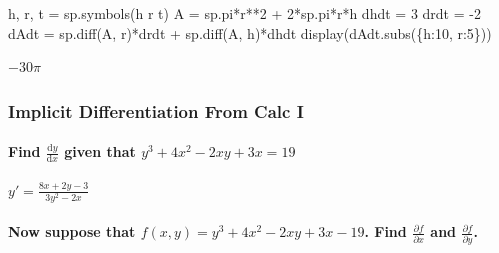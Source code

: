 \documentclass[
  letterpaper,
  DIV=11,
  numbers=noendperiod]{scrartcl}
\let\oldparagraph\paragraph
\renewcommand{\paragraph}[1]{\oldparagraph{#1}\mbox{}}
\newenvironment{Shaded}{\begin{snugshade}}{\end{snugshade}}
\newcommand{\DecValTok}[1]{\textcolor[rgb]{0.68,0.00,0.00}{#1}}
\newcommand{\NormalTok}[1]{\textcolor[rgb]{0.00,0.23,0.31}{#1}}
\newcommand{\OperatorTok}[1]{\textcolor[rgb]{0.37,0.37,0.37}{#1}}
\newcommand{\StringTok}[1]{\textcolor[rgb]{0.13,0.47,0.30}{#1}}
\begin{document}
\begin{Shaded}
\begin{Highlighting}[numbers=left,,]
\NormalTok{h, r, t }\OperatorTok{=}\NormalTok{ sp.symbols(}\StringTok{\textquotesingle{}h r t\textquotesingle{}}\NormalTok{)}
\NormalTok{A }\OperatorTok{=}\NormalTok{ sp.pi}\OperatorTok{*}\NormalTok{r}\OperatorTok{**}\DecValTok{2} \OperatorTok{+} \DecValTok{2}\OperatorTok{*}\NormalTok{sp.pi}\OperatorTok{*}\NormalTok{r}\OperatorTok{*}\NormalTok{h}
\NormalTok{dhdt }\OperatorTok{=} \DecValTok{3}
\NormalTok{drdt }\OperatorTok{=} \OperatorTok{{-}}\DecValTok{2}
\NormalTok{dAdt }\OperatorTok{=}\NormalTok{ sp.diff(A, r)}\OperatorTok{*}\NormalTok{drdt }\OperatorTok{+}\NormalTok{ sp.diff(A, h)}\OperatorTok{*}\NormalTok{dhdt}
\NormalTok{display(dAdt.subs(\{h:}\DecValTok{10}\NormalTok{, r:}\DecValTok{5}\NormalTok{\}))}
\end{Highlighting}
\end{Shaded}

$\displaystyle - 30 \pi$

\hypertarget{implicit-differentiation-from-calc-i}{%
\subsubsection{Implicit Differentiation From Calc
I}\label{implicit-differentiation-from-calc-i}}

\hypertarget{find-fracmathrmdymathrmdx-given-that-y3-4x2---2xy-3x-19}{%
\paragraph{\texorpdfstring{Find \(\frac{\mathrm{d}y}{\mathrm{d}x}\)
given that
\(y^3 + 4x^2 - 2xy +3x = 19\)}{Find \textbackslash frac\{\textbackslash mathrm\{d\}y\}\{\textbackslash mathrm\{d\}x\} given that y\^{}3 + 4x\^{}2 - 2xy +3x = 19}}\label{find-fracmathrmdymathrmdx-given-that-y3-4x2---2xy-3x-19}}

\(y' = \frac{8x+2y-3}{3y^2-2x}\)

\hypertarget{now-suppose-that-fxy-y3-4x2---2xy-3x---19.-find-fracpartial-fpartial-x-and-fracpartial-fpartial-y.}{%
\paragraph{\texorpdfstring{Now suppose that
\(f(x,y) = y^3 + 4x^2 - 2xy +3x - 19\). Find
\(\frac{\partial f}{\partial x}\) and
\(\frac{\partial f}{\partial y}\).}{Now suppose that f(x,y) = y\^{}3 + 4x\^{}2 - 2xy +3x - 19. Find \textbackslash frac\{\textbackslash partial f\}\{\textbackslash partial x\} and \textbackslash frac\{\textbackslash partial f\}\{\textbackslash partial y\}.}}\label{now-suppose-that-fxy-y3-4x2---2xy-3x---19.-find-fracpartial-fpartial-x-and-fracpartial-fpartial-y.}}
\end{document}
